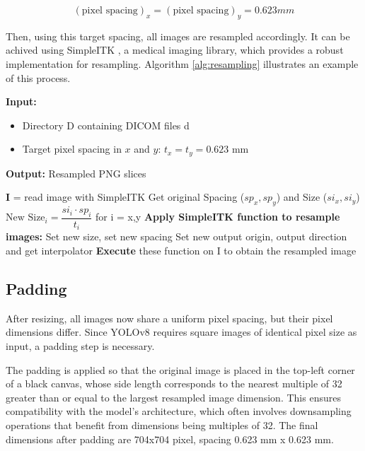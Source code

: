 \begin{equation*}
    (\text{pixel spacing})_x = (\text{pixel spacing})_y = 0.623 mm
\end{equation*}

Then, using this target spacing, all images are resampled accordingly.
It can be achived using SimpleITK \cite{beare2018,yaniv2018,lowekamp2013}, a medical imaging library, which provides a robust implementation for resampling. Algorithm \ref{alg:resampling} illustrates an example of this process.

\begin{algorithm}[!ht]
    \caption{Resampling DICOM Slices}
    \label{alg:resampling}
    \begin{algorithmic}[1]
    \State \textbf{Input:} 
    \begin{itemize}
        \item Directory D containing DICOM files d
        \item Target pixel spacing in $x$ and $y$: $t_x = t_y = 0.623$ mm
    \end{itemize}
    \State \textbf{Output:} Resampled PNG slices
    
    \State \textbf{I} = read image with SimpleITK
    \State Get original Spacing ($sp_x, sp_y$) and Size ($si_x, si_y$)
    \State $\text{New Size}_i = \dfrac{si_i \cdot sp_i}{t_i}$ for i = x,y 
    \State \hfill
    \State \textbf{Apply SimpleITK function to resample images:}
    \State Set new size, set new spacing
    \State Set new output origin, output direction and get interpolator
    \State \hfill
    \State \textbf{Execute} these function on I to obtain the resampled image
    \EndFor
 
    \end{algorithmic}
\end{algorithm}
    
\subsection*{Padding}
After resizing, all images now share a uniform pixel spacing, but their pixel dimensions differ. Since YOLOv8 requires square images of identical pixel size as input, a padding step is necessary.

The padding is applied so that the original image is placed in the top-left corner of a black canvas, whose side length corresponds to the nearest multiple of 32 greater than or equal to the largest resampled image dimension. This ensures compatibility with the model's architecture, which often involves downsampling operations that benefit from dimensions being multiples of 32.
The final dimensions after padding are 704x704 pixel, spacing 0.623 mm x 0.623 mm.


